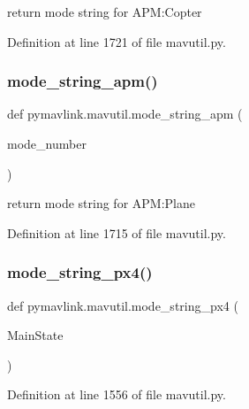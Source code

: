 \begin{DoxyVerb}return mode string for APM:Copter\end{DoxyVerb}
 

Definition at line 1721 of file mavutil.\+py.

\mbox{\label{namespacepymavlink_1_1mavutil_ae82875e1b8c41c234785cfe99012fa3d}} 
\subsubsection{\texorpdfstring{mode\_string\_apm()}{mode\_string\_apm()}}
{\footnotesize\ttfamily def pymavlink.\+mavutil.\+mode\+\_\+string\+\_\+apm (\begin{DoxyParamCaption}\item[{}]{mode\+\_\+number }\end{DoxyParamCaption})}

\begin{DoxyVerb}return mode string for APM:Plane\end{DoxyVerb}
 

Definition at line 1715 of file mavutil.\+py.

\mbox{\label{namespacepymavlink_1_1mavutil_af5358f89a8c0b59e034e262e8955e2c8}} 
\subsubsection{\texorpdfstring{mode\_string\_px4()}{mode\_string\_px4()}}
{\footnotesize\ttfamily def pymavlink.\+mavutil.\+mode\+\_\+string\+\_\+px4 (\begin{DoxyParamCaption}\item[{}]{Main\+State }\end{DoxyParamCaption})}



Definition at line 1556 of file mavutil.\+py.

\mbox{\label{namespacepymavlink_1_1mavutil_a783db06982d9f522333a924ab479771b}} 

